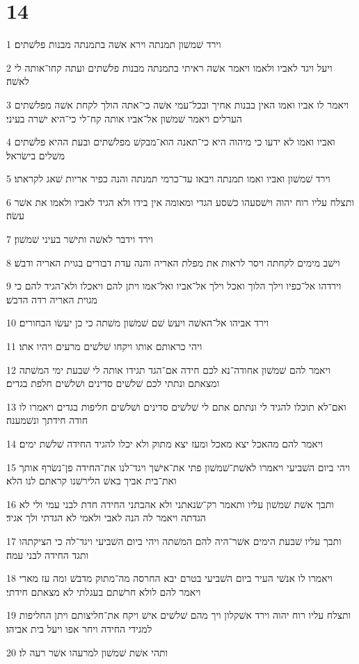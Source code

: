 \chapter{14}

\par 1 וירד שׁמשׁון תמנתה וירא אשׁה בתמנתה מבנות פלשׁתים׃
\par 2 ויעל ויגד לאביו ולאמו ויאמר אשׁה ראיתי בתמנתה מבנות פלשׁתים ועתה קחו־אותה לי לאשׁה׃
\par 3 ויאמר לו אביו ואמו האין בבנות אחיך ובכל־עמי אשׁה כי־אתה הולך לקחת אשׁה מפלשׁתים הערלים ויאמר שׁמשׁון אל־אביו אותה קח־לי כי־היא ישׁרה בעיני׃
\par 4 ואביו ואמו לא ידעו כי מיהוה היא כי־תאנה הוא־מבקשׁ מפלשׁתים ובעת ההיא פלשׁתים משׁלים בישׂראל׃
\par 5 וירד שׁמשׁון ואביו ואמו תמנתה ויבאו עד־כרמי תמנתה והנה כפיר אריות שׁאג לקראתו׃
\par 6 ותצלח עליו רוח יהוה וישׁסעהו כשׁסע הגדי ומאומה אין בידו ולא הגיד לאביו ולאמו את אשׁר עשׂה׃
\par 7 וירד וידבר לאשׁה ותישׁר בעיני שׁמשׁון׃
\par 8 וישׁב מימים לקחתה ויסר לראות את מפלת האריה והנה עדת דבורים בגוית האריה ודבשׁ׃
\par 9 וירדהו אל־כפיו וילך הלוך ואכל וילך אל־אביו ואל־אמו ויתן להם ויאכלו ולא־הגיד להם כי מגוית האריה רדה הדבשׁ׃
\par 10 וירד אביהו אל־האשׁה ויעשׂ שׁם שׁמשׁון משׁתה כי כן יעשׂו הבחורים׃
\par 11 ויהי כראותם אותו ויקחו שׁלשׁים מרעים ויהיו אתו׃
\par 12 ויאמר להם שׁמשׁון אחודה־נא לכם חידה אם־הגד תגידו אותה לי שׁבעת ימי המשׁתה ומצאתם ונתתי לכם שׁלשׁים סדינים ושׁלשׁים חלפת בגדים׃
\par 13 ואם־לא תוכלו להגיד לי ונתתם אתם לי שׁלשׁים סדינים ושׁלשׁים חליפות בגדים ויאמרו לו חודה חידתך ונשׁמענה׃
\par 14 ויאמר להם מהאכל יצא מאכל ומעז יצא מתוק ולא יכלו להגיד החידה שׁלשׁת ימים׃
\par 15 ויהי ביום השׁביעי ויאמרו לאשׁת־שׁמשׁון פתי את־אישׁך ויגד־לנו את־החידה פן־נשׂרף אותך ואת־בית אביך באשׁ הלירשׁנו קראתם לנו הלא׃
\par 16 ותבך אשׁת שׁמשׁון עליו ותאמר רק־שׂנאתני ולא אהבתני החידה חדת לבני עמי ולי לא הגדתה ויאמר לה הנה לאבי ולאמי לא הגדתי ולך אגיד׃
\par 17 ותבך עליו שׁבעת הימים אשׁר־היה להם המשׁתה ויהי ביום השׁביעי ויגד־לה כי הציקתהו ותגד החידה לבני עמה׃
\par 18 ויאמרו לו אנשׁי העיר ביום השׁביעי בטרם יבא החרסה מה־מתוק מדבשׁ ומה עז מארי ויאמר להם לולא חרשׁתם בעגלתי לא מצאתם חידתי׃
\par 19 ותצלח עליו רוח יהוה וירד אשׁקלון ויך מהם שׁלשׁים אישׁ ויקח את־חליצותם ויתן החליפות למגידי החידה ויחר אפו ויעל בית אביהו׃
\par 20 ותהי אשׁת שׁמשׁון למרעהו אשׁר רעה לו׃


